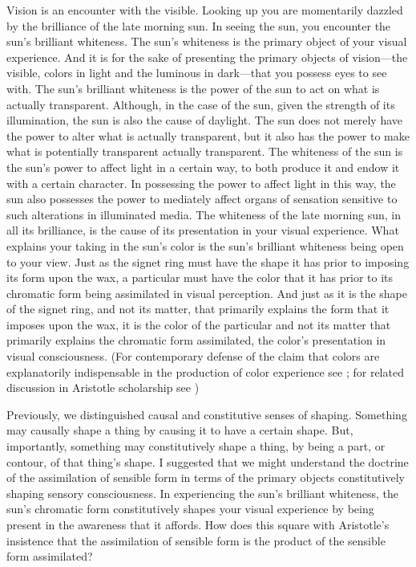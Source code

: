 Vision is an encounter with the visible. Looking up you are momentarily dazzled by the brilliance of the late morning sun. In seeing the sun, you encounter the sun's brilliant whiteness. The sun's whiteness is the primary object of your visual experience. And it is for the sake of presenting the primary objects of vision---the visible, colors in light and the luminous in dark---that you possess eyes to see with. The sun's brilliant whiteness is the power of the sun to act on what is actually transparent. Although, in the case of the sun, given the strength of its illumination, the sun is also the cause of daylight. The sun does not merely have the power to alter what is actually transparent, but it also has the power to make what is potentially transparent actually transparent. The whiteness of the sun is the sun's power to affect light in a certain way, to both produce it and endow it with a certain character. In possessing the power to affect light in this way, the sun also possesses the power to mediately affect organs of sensation sensitive to such alterations in illuminated media. The whiteness of the late morning sun, in all its brilliance, is the cause of its presentation in your visual experience. What explains your taking in the sun's color is the sun's brilliant whiteness being open to your view. Just as the signet ring must have the shape it has prior to imposing its form upon the wax, a particular must have the color that it has prior to its chromatic form being assimilated in visual perception. And just as it is the shape of the signet ring, and not its matter, that primarily explains the form that it imposes upon the wax, it is the color of the particular and not its matter that primarily explains the chromatic form assimilated, the color's presentation in visual consciousness. (For contemporary defense of the claim that colors are explanatorily indispensable in the production of color experience see \citealt{Campbell:1997dq,Broackes:1997pa}; for related discussion in Aristotle scholarship see \citealt{Broadie:1993fk,Broackes:1999uq})


Previously, we distinguished causal and constitutive senses of shaping. Something may causally shape a thing by causing it to have a certain shape. But, importantly, something may constitutively shape a thing, by being a part, or contour, of that thing's shape. I suggested that we might understand the doctrine of the assimilation of sensible form in terms of the primary objects constitutively shaping sensory consciousness. In experiencing the sun's brilliant whiteness, the sun's chromatic form constitutively shapes your visual experience by being present in the awareness that it affords. How does this square with Aristotle's insistence that the assimilation of sensible form is the product of the sensible form assimilated?

